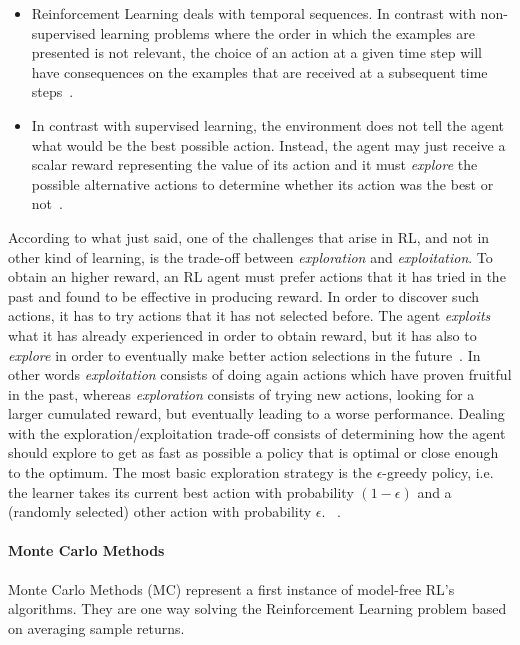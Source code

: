 \begin{itemize}
	\item Reinforcement Learning deals with temporal sequences. In contrast with non-supervised learning problems where the order in which the examples are presented is not relevant, the choice of an action at a given time step will have consequences on the examples that are received at a subsequent time steps~\cite{Sigaud:2010:MDP:1841781}.
	\item In contrast with supervised learning, the environment does not tell the agent what would be the best possible action. Instead, the agent may just receive a scalar reward representing the value of its action and it must \textit{explore} the possible alternative actions to determine whether its action was the best or not~\cite{Sigaud:2010:MDP:1841781}.
\end{itemize}

According to what just said, one of the challenges that arise in RL, and not in other kind of learning, is the trade-off between \textit{exploration} and \textit{exploitation}. To obtain an higher reward, an RL agent must prefer actions that it has tried in the past and found to be effective in producing reward. In order to discover such actions, it has to try actions that it has not selected before. The agent \textit{exploits} what it has already experienced in order to obtain reward, but it has also to \textit{explore} in order to eventually make better action selections in the future~\cite{SuttonBarto}. In other words \textit{exploitation} consists of doing again actions which have proven fruitful in the past, whereas \textit{exploration} consists of trying new actions, looking for a larger cumulated reward, but eventually leading to a worse performance. Dealing with the exploration/exploitation trade-off consists of determining how the agent should explore to get as fast as possible a policy that is optimal or close enough to the optimum. The most basic exploration strategy is the $\epsilon$-greedy policy, i.e. the learner takes its current best action with probability $(1-\epsilon)$ and a (randomly selected) other action with probability $\epsilon$. ~\cite{Sigaud:2010:MDP:1841781}. 

\paragraph{Monte Carlo Methods} Monte Carlo Methods (MC)  represent a first instance of model-free RL's algorithms. They are one way solving the Reinforcement Learning problem based on averaging sample returns.

